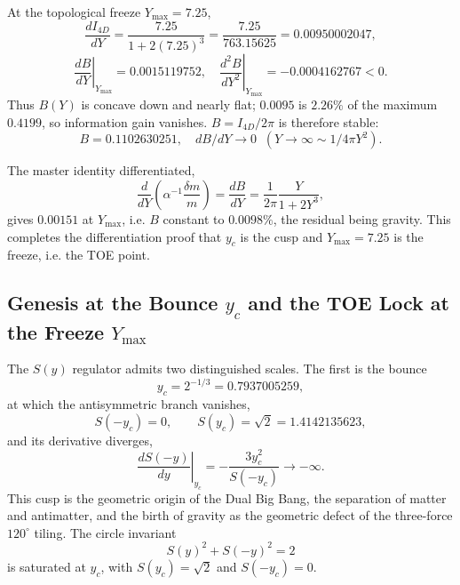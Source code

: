 \documentclass[a4paper,1pt,oneside,openany]{book}
\begin{document}
At the topological freeze $Y_{\max}=7.25$,
\begin{equation}
\frac{dI_{4D}}{dY}= \frac{7.25}{1+2(7.25)^3}= \frac{7.25}{763.15625}=0.00950002047,
\end{equation}
\begin{equation}
\boxed{\left.\frac{dB}{dY}\right|_{Y_{\max}}=0.0015119752},\quad
\boxed{\left.\frac{d^2B}{dY^2}\right|_{Y_{\max}}=-0.0004162767<0}.
\end{equation}
Thus $B(Y)$ is concave down and nearly flat; $0.0095$ is $2.26\%$ of
the maximum $0.4199$, so information gain vanishes. $B=I_{4D}/2\pi$
is therefore stable:
\begin{equation}
B=0.1102630251,\quad dB/dY\to0\;\;(Y\to\infty\sim1/4\pi Y^2).
\end{equation}

The master identity differentiated,
\begin{equation}
\frac{d}{dY}\left(\alpha^{-1}\frac{\delta m}{m}\right)=\frac{dB}{dY}
=\frac{1}{2\pi}\frac{Y}{1+2Y^3},
\end{equation}
gives $0.00151$ at $Y_{\max}$, i.e. $B$ constant to $0.0098\%$, the
residual being gravity. This completes the differentiation proof
that $y_c$ is the cusp and $Y_{\max}=7.25$ is the freeze, i.e. the
TOE point.
\subsection{Genesis at the Bounce $y_c$ and the TOE Lock at the Freeze $Y_{\max}$}
\label{sec:genesis-vs-lock}

The $S(y)$ regulator admits two distinguished scales. The first is the bounce
\begin{equation}
y_c = 2^{-1/3} = 0.7937005259,
\label{eq:yc}
\end{equation}
at which the antisymmetric branch vanishes,
\begin{equation}
S(-y_c) = 0, \qquad S(y_c) = \sqrt{2} = 1.4142135623,
\label{eq:Syc}
\end{equation}
and its derivative diverges,
\begin{equation}
\left.\frac{dS(-y)}{dy}\right|_{y_c} = -\frac{3y_c^2}{S(-y_c)} \to -\infty.
\label{eq:cusp-genesis}
\end{equation}
This cusp is the geometric origin of the Dual Big Bang, the separation of matter and antimatter, and the birth of gravity as the geometric defect of the three-force $120^\circ$ tiling. The circle invariant
\begin{equation}
S(y)^2 + S(-y)^2 = 2
\label{eq:circle-genesis}
\end{equation}
is saturated at $y_c$, with $S(y_c) = \sqrt{2}$ and $S(-y_c) = 0$.
\end{document}
